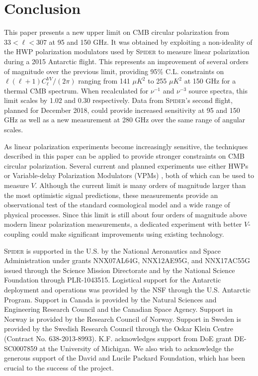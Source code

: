 \documentclass[twocolumn]{aastex61}
\begin{document}
\section{Conclusion}
\label{sec:discussion}
This paper presents a new upper limit on CMB circular polarization from $33<\ell<307$ at 95 and 150 GHz.  It was obtained by exploiting a non-ideality of the HWP polarization modulators used by \textsc{Spider} to measure linear polarization during a 2015 Antarctic flight. This represents an improvement of several orders of magnitude over the previous limit, providing 95\% C.L. constraints on $\ell (\ell+1)C_{\ell}^{VV}/(2\pi)$ ranging from 141 $\mu K ^2$ to 255 $\mu K ^2$ at 150 GHz for a thermal CMB spectrum.   When recalculated for $\nu^{-1}$ and $\nu^{-3}$ source spectra, this limit scales by 1.02 and 0.30 respectively.  Data from \textsc{Spider}'s second flight, planned for December 2018, could provide increased sensitivity at 95 and 150 GHz as well as a new measurement at 280 GHz over the same range of angular scales.

As linear polarization experiments become increasingly sensitive, the techniques described in this paper can be applied to provide stronger constraints on CMB circular polarization. Several current and planned experiments use either HWPs or Variable-delay Polarization Modulators (VPMs) \citep{VPM_paper}, both of which can be used to measure $V$.  Although the current limit is many orders of magnitude larger than the most optimistic signal predictions, these measurements provide an observational test of the standard cosmological model and a wide range of physical processes. Since this limit is still about four orders of magnitude above modern linear polarization measurements, a dedicated experiment with better $V$-coupling could make significant improvements using existing technology.


\acknowledgments
\textsc{Spider} is supported in the U.S. by the National Aeronautics and Space Administration under grants NNX07AL64G, NNX12AE95G, and NNX17AC55G issued through the Science Mission Directorate and by the National Science Foundation through PLR-1043515. Logistical support for the Antarctic deployment and operations was provided by the NSF through the U.S. Antarctic Program.  Support in Canada is provided by the Natural Sciences and Engineering Research Council and the Canadian Space Agency.  Support in Norway is provided by the Research Council of Norway.  Support in Sweden is provided by the Swedish Research Council through the Oskar Klein Centre (Contract No. 638-2013-8993).  K.F. acknowledges support from DoE grant DE-SC0007859 at the University of Michigan.  We also wish to acknowledge the generous support of the David and Lucile Packard Foundation, which has been crucial to the success of the project. 
\end{document}
